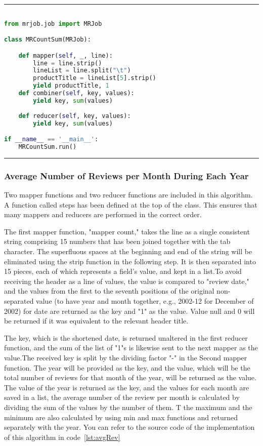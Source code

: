 \rule{200 pt}{0.5 pt} 

\renewcommand{\lstlistingname}{Code}
\lstset{style=mystyle}
\begin{lstlisting}[language=Python, caption={Number of Reviews for each Product}, label={lst:reviewsProduct}, mathescape = true, breaklines=true]

from mrjob.job import MRJob

class MRCountSum(MRJob):

    def mapper(self, _, line):
        line = line.strip()  
        lineList = line.split("\t")
        productTitle = lineList[5].strip()
        yield productTitle, 1
    def combiner(self, key, values):
        yield key, sum(values)
        
    def reducer(self, key, values):
        yield key, sum(values)

if __name__ == '__main__':
    MRCountSum.run()

\end{lstlisting}

\rule{200 pt}{0.5 pt} 

\subsubsection{Average Number of Reviews per Month During Each Year} 
Two mapper functions and two reducer functions are included in this algorithm. A function called steps has been defined at the top of the class. This ensures that many mappers and reducers are performed in the correct order.

The first mapper function, "mapper count," takes the line as a single consistent string comprising 15 numbers that has been joined together with the tab character. The superfluous spaces at the beginning and end of the string will be eliminated using the strip function in the following step. It is then separated into 15 pieces, each of which represents a field's value, and kept in a list.To avoid receiving the header as a line of values, the value is compared to "review date," and the values from the first to the seventh positions of the original non-separated value (to have year and month together, e.g., 2002-12 for December of 2002) for date are returned as the key and "1" as the value. Value null and 0 will be returned if it was equivalent to the relevant header title.

The key, which is the shortened date, is returned unaltered in the first reducer function, and the sum of the list of "1"s is likewise sent to the next mapper as the value.The received key is split by the dividing factor "-" in the Second mapper function. The year will be provided as the key, and the value, which will be the total number of reviews for that month of the year, will be returned as the value. The value of the year is returned as the key, and the values for each month are saved in a list, the average number of the review per month is calculated by dividing the sum of the values by the number of them. T the maximum and the minimum are also calculated by using min and max functions and returned separately with the year. You can refer to the source code of the implementation of this algorithm in code~\ref{lst:avgRev}


